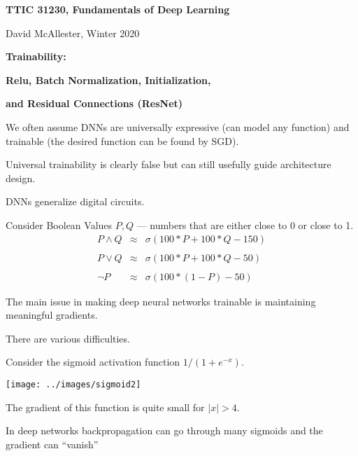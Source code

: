 




{\Huge

  \centerline{\bf TTIC 31230, Fundamentals of Deep Learning}
  \bigskip
  \centerline{David McAllester, Winter 2020}

    \vfill
  \centerline{\bf Trainability:}
  \vfill
  \centerline{\bf Relu, Batch Normalization, Initialization,}
  \vfill
  \centerline{\bf and Residual Connections (ResNet)}
  \vfill
  \vfill





We often assume DNNs are universally expressive (can model any function) and trainable (the desired function can be found by SGD).

\vfill
Universal trainability is clearly false but can still usefully guide architecture design.


DNNs generalize digital circuits.

\vfill
Consider Boolean Values $P,Q$ --- numbers that are either close to 0 or close to 1.
\begin{eqnarray*}
P \wedge Q & \approx & \sigma(100*P + 100* Q -150) \\
\\
P \vee Q & \approx & \sigma(100*P + 100* Q -50) \\
\\
\neg P & \approx & \sigma(100*(1-P) - 50)
\end{eqnarray*}


The main issue in making deep neural networks trainable is maintaining meaningful gradients.

\vfill
There are various difficulties.


Consider the sigmoid activation function $1/(1+ e^{-x})$.

\vfill
\centerline{\texttt{[image: ../images/sigmoid2]}}


\vfill
The gradient of this function is quite small for $|x| > 4$.

\vfill
In deep networks backpropagation can go through many sigmoids and
the gradient can ``vanish''


}
